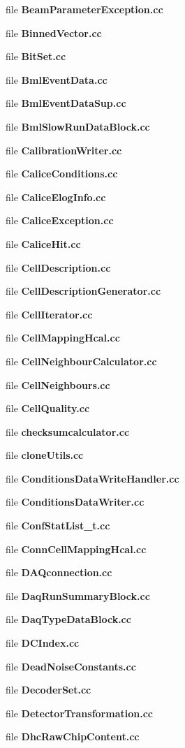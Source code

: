 \begin{DoxyCompactItemize}
file {\bfseries BeamParameterException.cc}
\item 
file {\bfseries BinnedVector.cc}
\item 
file {\bfseries BitSet.cc}
\item 
file {\bfseries BmlEventData.cc}
\item 
file {\bfseries BmlEventDataSup.cc}
\item 
file {\bfseries BmlSlowRunDataBlock.cc}
\item 
file {\bfseries CalibrationWriter.cc}
\item 
file {\bfseries CaliceConditions.cc}
\item 
file {\bfseries CaliceElogInfo.cc}
\item 
file {\bfseries CaliceException.cc}
\item 
file {\bfseries CaliceHit.cc}
\item 
file {\bfseries CellDescription.cc}
\item 
file {\bfseries CellDescriptionGenerator.cc}
\item 
file {\bfseries CellIterator.cc}
\item 
file {\bfseries CellMappingHcal.cc}
\item 
file {\bfseries CellNeighbourCalculator.cc}
\item 
file {\bfseries CellNeighbours.cc}
\item 
file {\bfseries CellQuality.cc}
\item 
file {\bfseries checksumcalculator.cc}
\item 
file {\bfseries cloneUtils.cc}
\item 
file {\bfseries ConditionsDataWriteHandler.cc}
\item 
file {\bfseries ConditionsDataWriter.cc}
\item 
file {\bfseries ConfStatList\_\-t.cc}
\item 
file {\bfseries ConnCellMappingHcal.cc}
\item 
file {\bfseries DAQconnection.cc}
\item 
file {\bfseries DaqRunSummaryBlock.cc}
\item 
file {\bfseries DaqTypeDataBlock.cc}
\item 
file {\bfseries DCIndex.cc}
\item 
file {\bfseries DeadNoiseConstants.cc}
\item 
file {\bfseries DecoderSet.cc}
\item 
file {\bfseries DetectorTransformation.cc}
\item 
file {\bfseries DhcRawChipContent.cc}

\end{DoxyCompactItemize}
